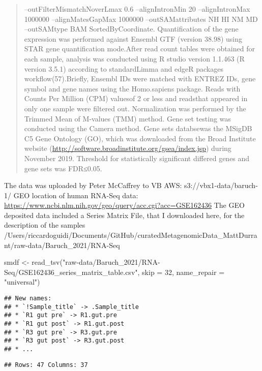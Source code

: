\documentclass[
]{article}
\newenvironment{Shaded}{\begin{snugshade}}{\end{snugshade}}
\newcommand{\AttributeTok}[1]{\textcolor[rgb]{0.77,0.63,0.00}{#1}}
\newcommand{\DecValTok}[1]{\textcolor[rgb]{0.00,0.00,0.81}{#1}}
\newcommand{\FunctionTok}[1]{\textcolor[rgb]{0.00,0.00,0.00}{#1}}
\newcommand{\NormalTok}[1]{#1}
\newcommand{\OtherTok}[1]{\textcolor[rgb]{0.56,0.35,0.01}{#1}}
\newcommand{\StringTok}[1]{\textcolor[rgb]{0.31,0.60,0.02}{#1}}
\begin{document}
\begin{quote}
{--outFilterMismatchNoverLmax 0.6 --alignIntronMin 20 --alignIntronMax
1000000 --alignMatesGapMax 1000000 --outSAMattributes NH HI NM MD
--outSAMtype BAM SortedByCoordinate.} Quantification of the gene
expression was performed against Ensembl GTF (version 38.98) using STAR
gene quantification mode.After read count tables were obtained for each
sample, analysis was conducted using R studio version 1.1.463 (R version
3.5.1) according to standardLimma and edgeR packages
workflow(57).Briefly, Ensembl IDs were matched with ENTREZ IDs, gene
symbol and gene names using the Homo.sapiens package. Reads with Counts
Per Million (CPM) valuesof 2 or less and readsthat appeared in only one
sample were filtered out. Normalization was performed by the Trimmed
Mean of M-values (TMM) method. Gene set testing was conducted using the
Camera method. Gene sets databsewas the MSigDB C5 Gene Ontology (GO),
which was downloaded from the Broad Institute website
(\url{http://software.broadinstitute.org/gsea/index.jsp}) during
November 2019. Threshold for statistically significant differed genes
and gene sets was FDR≤0.05.
\end{quote}

The data was uploaded by Peter McCaffrey to VB AWS:
s3://vbx1-data/baruch-1/ GEO location of human RNA-Seq data:
\url{https://www.ncbi.nlm.nih.gov/geo/query/acc.cgi?acc=GSE162436} The
GEO deposited data included a Series Matrix File, that I downloaded
here, for the description of the samples
/Users/riccardoguidi/Documents/GitHub/curatedMetagenomicData\_MattDurrant/raw-data/Baruch\_2021/RNA-Seq

\begin{Shaded}
\begin{Highlighting}[]
\NormalTok{smdf }\OtherTok{\textless{}{-}} \FunctionTok{read\_tsv}\NormalTok{(}\StringTok{"raw{-}data/Baruch\_2021/RNA{-}Seq/GSE162436\_series\_matrix\_table.csv"}\NormalTok{, }\AttributeTok{skip =} \DecValTok{32}\NormalTok{, }\AttributeTok{name\_repair =} \StringTok{"universal"}\NormalTok{)}
\end{Highlighting}
\end{Shaded}

\begin{verbatim}
## New names:
## * `!Sample_title` -> .Sample_title
## * `R1 gut pre` -> R1.gut.pre
## * `R1 gut post` -> R1.gut.post
## * `R3 gut pre` -> R3.gut.pre
## * `R3 gut post` -> R3.gut.post
## * ...
\end{verbatim}

\begin{verbatim}
## Rows: 47 Columns: 37
\end{verbatim}
\end{document}
